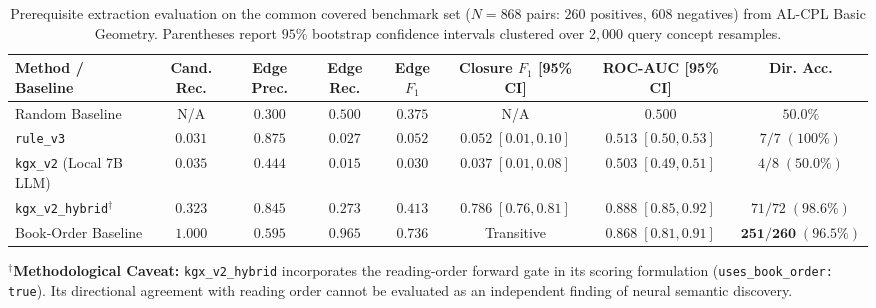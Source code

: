 \begin{table}[t]
\centering
\small
\caption{Prerequisite extraction evaluation on the common covered benchmark set ($N=868$ pairs: $260$ positives, $608$ negatives) from AL-CPL Basic Geometry. Parentheses report $95\%$ bootstrap confidence intervals clustered over $2{,}000$ query concept resamples.}
\label{tab:main_results}
\begin{tabularx}{\textwidth}{l c c c c c c c}
\toprule
\textbf{Method / Baseline} & \textbf{Cand. Rec.} & \textbf{Edge Prec.} & \textbf{Edge Rec.} & \textbf{Edge $F_1$} & \textbf{Closure $F_1$ [95\% CI]} & \textbf{ROC-AUC [95\% CI]} & \textbf{Dir. Acc.} \\
\midrule
Random Baseline & N/A & $0.300$ & $0.500$ & $0.375$ & N/A & $0.500$ & $50.0\%$ \\
\texttt{rule\_v3} & $0.031$ & $\mathbf{0.875}$ & $0.027$ & $0.052$ & $0.052\;[0.01, 0.10]$ & $0.513\;[0.50, 0.53]$ & $7 / 7\;(100\%)$ \\
\texttt{kgx\_v2} (Local 7B LLM) & $0.035$ & $0.444$ & $0.015$ & $0.030$ & $0.037\;[0.01, 0.08]$ & $0.503\;[0.49, 0.51]$ & $4 / 8\;(50.0\%)$ \\
\texttt{kgx\_v2\_hybrid}$^\dagger$ & $0.323$ & $0.845$ & $0.273$ & $0.413$ & $\mathbf{0.786}\;[0.76, 0.81]$ & $\mathbf{0.888}\;[0.85, 0.92]$ & $71 / 72\;(98.6\%)$ \\
Book-Order Baseline & $\mathbf{1.000}$ & $0.595$ & $\mathbf{0.965}$ & $\mathbf{0.736}$ & Transitive & $0.868\;[0.81, 0.91]$ & $\mathbf{251 / 260}\;(96.5\%)$ \\
\bottomrule
\end{tabularx}
\vspace{2pt}
\raggedright \footnotesize
$^\dagger$\textbf{Methodological Caveat:} \texttt{kgx\_v2\_hybrid} incorporates the reading-order forward gate in its scoring formulation (\texttt{uses\_book\_order: true}). Its directional agreement with reading order cannot be evaluated as an independent finding of neural semantic discovery.
\end{table}
